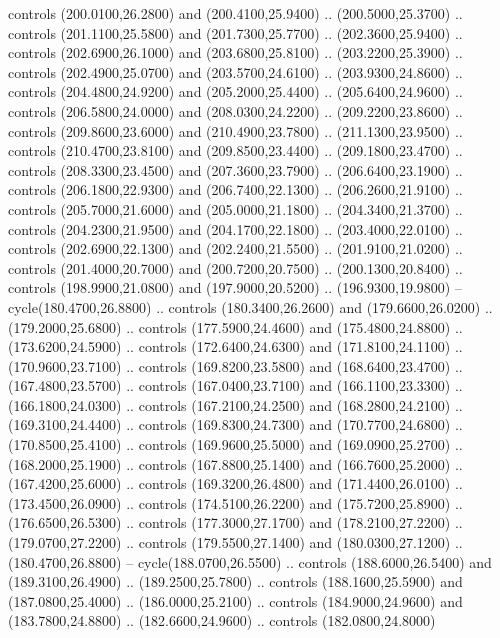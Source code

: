 {\begin{scope}[y=0.80pt, x=0.80pt, yscale=-1, xscale=1, inner sep=0pt, outer sep=0pt, #1]
      controls (200.0100,26.2800) and (200.4100,25.9400) .. (200.5000,25.3700) ..
      controls (201.1100,25.5800) and (201.7300,25.7700) .. (202.3600,25.9400) ..
      controls (202.6900,26.1000) and (203.6800,25.8100) .. (203.2200,25.3900) ..
      controls (202.4900,25.0700) and (203.5700,24.6100) .. (203.9300,24.8600) ..
      controls (204.4800,24.9200) and (205.2000,25.4400) .. (205.6400,24.9600) ..
      controls (206.5800,24.0000) and (208.0300,24.2200) .. (209.2200,23.8600) ..
      controls (209.8600,23.6000) and (210.4900,23.7800) .. (211.1300,23.9500) ..
      controls (210.4700,23.8100) and (209.8500,23.4400) .. (209.1800,23.4700) ..
      controls (208.3300,23.4500) and (207.3600,23.7900) .. (206.6400,23.1900) ..
      controls (206.1800,22.9300) and (206.7400,22.1300) .. (206.2600,21.9100) ..
      controls (205.7000,21.6000) and (205.0000,21.1800) .. (204.3400,21.3700) ..
      controls (204.2300,21.9500) and (204.1700,22.1800) .. (203.4000,22.0100) ..
      controls (202.6900,22.1300) and (202.2400,21.5500) .. (201.9100,21.0200) ..
      controls (201.4000,20.7000) and (200.7200,20.7500) .. (200.1300,20.8400) ..
      controls (198.9900,21.0800) and (197.9000,20.5200) .. (196.9300,19.9800) --
      cycle(180.4700,26.8800) .. controls (180.3400,26.2600) and (179.6600,26.0200)
      .. (179.2000,25.6800) .. controls (177.5900,24.4600) and (175.4800,24.8800) ..
      (173.6200,24.5900) .. controls (172.6400,24.6300) and (171.8100,24.1100) ..
      (170.9600,23.7100) .. controls (169.8200,23.5800) and (168.6400,23.4700) ..
      (167.4800,23.5700) .. controls (167.0400,23.7100) and (166.1100,23.3300) ..
      (166.1800,24.0300) .. controls (167.2100,24.2500) and (168.2800,24.2100) ..
      (169.3100,24.4400) .. controls (169.8300,24.7300) and (170.7700,24.6800) ..
      (170.8500,25.4100) .. controls (169.9600,25.5000) and (169.0900,25.2700) ..
      (168.2000,25.1900) .. controls (167.8800,25.1400) and (166.7600,25.2000) ..
      (167.4200,25.6000) .. controls (169.3200,26.4800) and (171.4400,26.0100) ..
      (173.4500,26.0900) .. controls (174.5100,26.2200) and (175.7200,25.8900) ..
      (176.6500,26.5300) .. controls (177.3000,27.1700) and (178.2100,27.2200) ..
      (179.0700,27.2200) .. controls (179.5500,27.1400) and (180.0300,27.1200) ..
      (180.4700,26.8800) -- cycle(188.0700,26.5500) .. controls (188.6000,26.5400)
      and (189.3100,26.4900) .. (189.2500,25.7800) .. controls (188.1600,25.5900)
      and (187.0800,25.4000) .. (186.0000,25.2100) .. controls (184.9000,24.9600)
      and (183.7800,24.8800) .. (182.6600,24.9600) .. controls (182.0800,24.8000)

\end{scope}}
